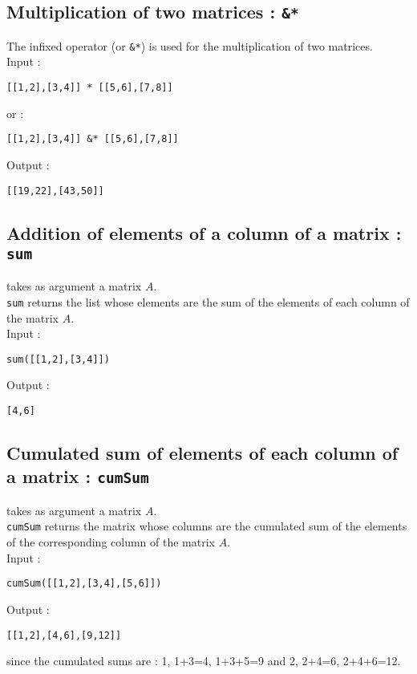 \documentclass[a4paper,11pt]{book}
\begin{document}
\subsection{Multiplication of two matrices : {\tt * \&*}}\index{*}\index{\&*}
\noindent The infixed operator {\tt *} (or {\tt \&*}) is used for the
multiplication of two matrices.\\
Input :
\begin{center}{\tt [[1,2],[3,4]] * [[5,6],[7,8]]}\end{center}
or :
\begin{center}{\tt [[1,2],[3,4]] \&* [[5,6],[7,8]]}\end{center}
Output :
\begin{center}{\tt [[19,22],[43,50]]}\end{center}

\subsection{Addition of elements of a column of a matrix : {\tt sum}} 
 takes as argument a matrix $A$.\\
{\tt sum} returns the list whose elements are the sum of the elements of each 
column of the matrix $A$.\\
Input :
\begin{center}{\tt sum([[1,2],[3,4]])}\end{center}
Output :
\begin{center}{\tt [4,6]}\end{center}

\subsection{Cumulated sum of elements of each column of a matrix : {\tt cumSum}} 
 takes as argument a matrix $A$.\\
{\tt cumSum} returns the matrix whose columns are the cumulated sum of the
elements of the corresponding column of the matrix $A$.\\
Input :
\begin{center}{\tt cumSum([[1,2],[3,4],[5,6]])}\end{center}
Output :
\begin{center}{\tt [[1,2],[4,6],[9,12]]}\end{center}
since the  cumulated sums are : 1, 1+3=4, 1+3+5=9 and 2, 2+4=6, 2+4+6=12.
\end{document}
